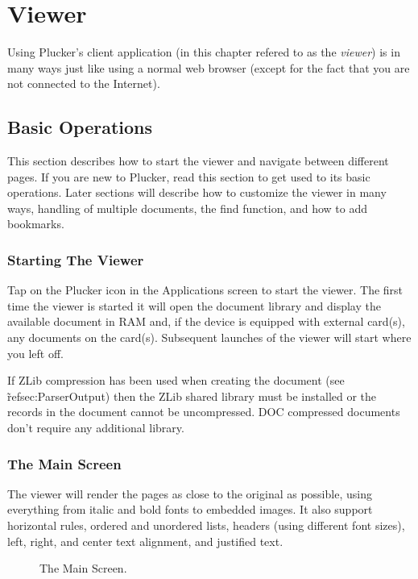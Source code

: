 %
%
\chapter{Viewer}

Using Plucker's client application (in this chapter refered to as
the \emph{viewer}) is in many ways just like using a normal web browser
(except for the fact that you are not connected to the Internet).


\section{Basic Operations}

This section describes how to start the viewer and navigate between
different pages. If you are new to Plucker, read this section to get
used to its basic operations. Later sections will describe how to customize
the viewer in many ways, handling of multiple documents, the find function,
and how to add bookmarks.

\subsection{Starting The Viewer}

Tap on the Plucker icon in the Applications screen to start the viewer. 
The first time the viewer is started it will open the document library
and display the available document in RAM and, if the device is
equipped with external card(s), any documents on the card(s). Subsequent
launches of the viewer will start where you left off.

If ZLib compression has been used when creating the document (see 
\~ref{sec:ParserOutput}) then the ZLib shared library must be installed 
or the records in the document cannot be uncompressed. DOC compressed 
documents don't require any additional library.

\subsection{The Main Screen}

The viewer will render the pages as close to the original as possible,
using everything from italic and bold fonts to embedded images. It 
also support horizontal rules, ordered and unordered lists, headers
(using different font sizes), left, right, and center text alignment,
and justified text.

\begin{figure} [!htb]
\centerline{}
\caption{\label{fig:MainScreen}The Main Screen.}
\end{figure}

